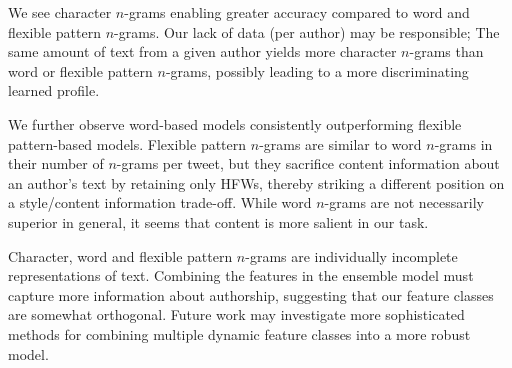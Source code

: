 \documentclass[twocolumn,10pt]{article}
\begin{document}
We see character $n$-grams enabling greater accuracy compared to word
and flexible pattern $n$-grams.
Our lack of data (per author) may be responsible;
The same amount of text from a given author yields more character $n$-grams
than word or flexible pattern $n$-grams, possibly leading to a more
discriminating learned profile.

We further observe word-based models consistently outperforming
flexible pattern-based models. Flexible pattern $n$-grams are similar to
word $n$-grams in their number of $n$-grams per tweet, but they
sacrifice content information about an author's text by retaining only HFWs,
thereby striking a different position on a style/content information
trade-off. 
While word $n$-grams are not necessarily superior in general, it seems
that content is more salient in our task.

Character, word and flexible pattern $n$-grams are individually
incomplete representations of text.
Combining the features in the ensemble model must capture more
information about authorship, suggesting that our feature classes
are somewhat orthogonal.
Future work may investigate more sophisticated methods for
combining multiple dynamic feature classes into a more robust model. 




\printbibliography
\end{document}
